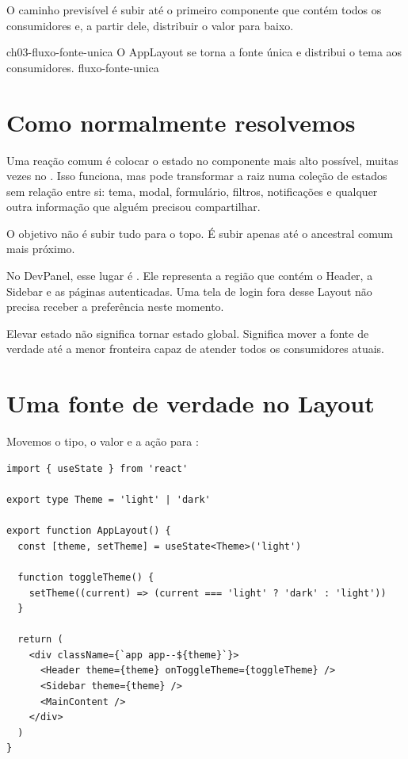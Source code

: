 O caminho previsível é subir até o primeiro componente que contém todos os
consumidores e, a partir dele, distribuir o valor para baixo.

\imagemcapitulo
  {ch03-fluxo-fonte-unica}
  {O AppLayout se torna a fonte única e distribui o tema aos consumidores.}
  {fluxo-fonte-unica}

\section{Como normalmente resolvemos}

Uma reação comum é colocar o estado no componente mais alto possível, muitas
vezes no . Isso funciona, mas pode transformar a raiz numa coleção
de estados sem relação entre si: tema, modal, formulário, filtros, notificações
e qualquer outra informação que alguém precisou compartilhar.

O objetivo não é subir tudo para o topo. É subir apenas até o ancestral comum
mais próximo.

No DevPanel, esse lugar é . Ele representa a região que contém
o Header, a Sidebar e as páginas autenticadas. Uma tela de login fora desse
Layout não precisa receber a preferência neste momento.

\begin{decisao}
Elevar estado não significa tornar estado global. Significa mover a fonte de
verdade até a menor fronteira capaz de atender todos os consumidores atuais.
\end{decisao}

\section{Uma fonte de verdade no Layout}

Movemos o tipo, o valor e a ação para :

\begin{lstlisting}[caption={O Layout passa a ser o dono do tema.},label={lst:theme-layout}]
import { useState } from 'react'

export type Theme = 'light' | 'dark'

export function AppLayout() {
  const [theme, setTheme] = useState<Theme>('light')

  function toggleTheme() {
    setTheme((current) => (current === 'light' ? 'dark' : 'light'))
  }

  return (
    <div className={`app app--${theme}`}>
      <Header theme={theme} onToggleTheme={toggleTheme} />
      <Sidebar theme={theme} />
      <MainContent />
    </div>
  )
}
\end{lstlisting}

